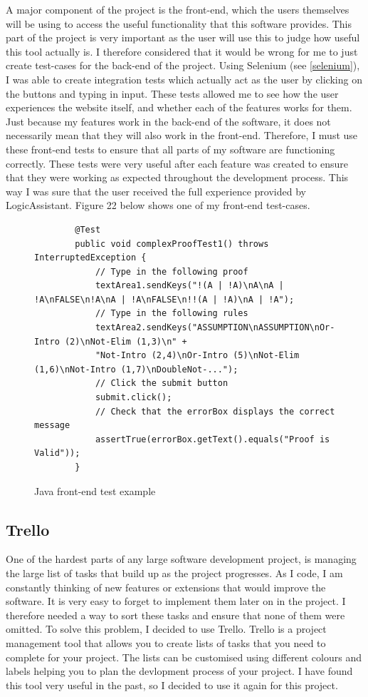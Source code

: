 A major component of the project is the front-end, which the users themselves will be using to access the useful functionality that this software provides. This part of the project is very important as the user will use this to judge how useful this tool actually is. I therefore considered that it would be wrong for me to just create test-cases for the back-end of the project. Using Selenium (see \ref{selenium}), I was able to create integration tests which actually act as the user by clicking on the buttons and typing in input. These tests allowed me to see how the user experiences the website itself, and whether each of the features works for them. Just because my features work in the back-end of the software, it does not necessarily mean that they will also work in the front-end. Therefore, I must use these front-end tests to ensure that all parts of my software are functioning correctly. These tests were very useful after each feature was created to ensure that they were working as expected throughout the development process. This way I was sure that the user received the full experience provided by LogicAssistant. Figure 22 below shows one of my front-end test-cases.

\begin{figure}[!ht]
\begin{lstlisting}
		@Test
		public void complexProofTest1() throws InterruptedException {
			// Type in the following proof
			textArea1.sendKeys("!(A | !A)\nA\nA | !A\nFALSE\n!A\nA | !A\nFALSE\n!!(A | !A)\nA | !A");
			// Type in the following rules
			textArea2.sendKeys("ASSUMPTION\nASSUMPTION\nOr-Intro (2)\nNot-Elim (1,3)\n" + 
			"Not-Intro (2,4)\nOr-Intro (5)\nNot-Elim (1,6)\nNot-Intro (1,7)\nDoubleNot-...");
			// Click the submit button
			submit.click();
			// Check that the errorBox displays the correct message
			assertTrue(errorBox.getText().equals("Proof is Valid"));
		}
\end{lstlisting}

\caption{Java front-end test example}
\end{figure}

\subsection{Trello \label{trello}}

One of the hardest parts of any large software development project, is managing the large list of tasks that build up as the project progresses. As I code, I am constantly thinking of new features or extensions that would improve the software. It is very easy to forget to implement them later on in the project. I therefore needed a way to sort these tasks and ensure that none of them were omitted. To solve this problem, I decided to use Trello. Trello is a project management tool that allows you to create lists of tasks that you need to complete for your project. The lists can be customised using different colours and labels helping you to plan the devlopment process of your project. I have found this tool very useful in the past, so I decided to use it again for this project.

